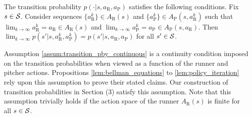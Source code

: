 \documentclass[opre,dblanonrev]{informs4}
\begin{document}
\begin{APPENDICES}
       \begin{assumption}
           \label{assum:transition_pby_continuous}
           The transition probability $p(\cdot|s,a_\text{R},a_\text{P})$ satisfies the following conditions. Fix $s \in {\cal S}$. Consider sequences $\{a_\text{R}^k\} \in A_\text{R}(s)$ and $\{a_\text{P}^k\} \in A_\text{P}(s,a_\text{R}^k)$ such that $\lim_{k \to \infty}a_\text{R}^k = a_\text{R} \in A_\text{R}(s)$ and  $\lim_{k \to \infty}a_\text{P}^k = a_\text{P} \in A_\text{P}(s,a_\text{R})$. Then $\lim_{k \to \infty}p(s'|s,a_\text{R}^k,a_\text{P}^k) = p(s'|s,a_\text{R},a_\text{P})$ for all $s' \in {\cal S}$.
       \end{assumption}
       \noindent Assumption \ref{assum:transition_pby_continuous} is a continuity condition imposed on the transition probabilities when viewed as a function of the runner and pitcher actions. Propositions  \ref{lem:bellman_equations} to \ref{lem:policy_iteration} rely upon this assumption to prove their stated claims. Our construction of transition probabilities in Section (3) satisfy this assumption. Note that this assumption trivially holds if the action space of the runner $A_\text{R}(s)$ is finite for all $s \in {\cal S}$.
    

\end{APPENDICES}
\end{document}
